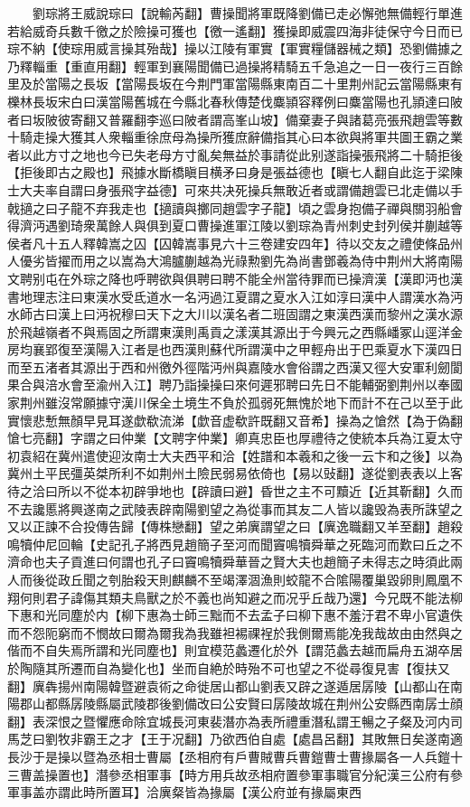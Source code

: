 　　劉琮將王威說琮曰【說輸芮翻】曹操聞將軍既降劉備已走必懈弛無備輕行單進若給威奇兵數千徼之於險操可獲也【徼一遙翻】獲操即威震四海非徒保守今日而已琮不納【使琮用威言操其殆哉】操以江陵有軍實【軍實糧儲器械之類】恐劉備據之乃釋輜重【重直用翻】輕軍到襄陽聞備已過操將精騎五千急追之一日一夜行三百餘里及於當陽之長坂【當陽長坂在今荆門軍當陽縣東南百二十里荆州記云當陽縣東有櫟林長坂宋白曰漢當陽舊城在今縣北春秋傳楚伐麋頴容釋例曰麋當陽也孔頴達曰陂者曰坂陂彼寄翻又普羅翻李巡曰陂者謂高峯山坡】備棄妻子與諸葛亮張飛趙雲等數十騎走操大獲其人衆輜重徐庶母為操所獲庶辭備指其心曰本欲與將軍共圖王霸之業者以此方寸之地也今已失老母方寸亂矣無益於事請從此别遂詣操張飛將二十騎拒後【拒後即古之殿也】飛據水斷橋瞋目横矛曰身是張益德也【瞋七人翻自此迄于梁陳士大夫率自謂曰身張飛字益德】可來共决死操兵無敢近者或謂備趙雲已北走備以手戟擿之曰子龍不弃我走也【擿讀與擲同趙雲字子龍】頃之雲身抱備子禪與關羽船會得濟沔遇劉琦衆萬餘人與俱到夏口曹操進軍江陵以劉琮為青州刺史封列侯并蒯越等侯者凡十五人釋韓嵩之囚【囚韓嵩事見六十三卷建安四年】待以交友之禮使條品州人優劣皆擢而用之以嵩為大鴻臚蒯越為光祿勲劉先為尚書鄧羲為侍中荆州大將南陽文聘别屯在外琮之降也呼聘欲與俱聘曰聘不能全州當待罪而已操濟漢【漢即沔也漢書地理志注曰東漢水受氐道水一名沔過江夏謂之夏水入江如淳曰漢中人謂漢水為沔水師古曰漢上曰沔祝穆曰天下之大川以漢名者二班固謂之東漢西漢而黎州之漢水源於飛越嶺者不與焉固之所謂東漢則禹貢之漾漢其源出于今興元之西縣嶓冢山逕洋金房均襄郢復至漢陽入江者是也西漢則蘇代所謂漢中之甲輕舟出于巴乘夏水下漢四日而至五渚者其源出于西和州徼外徑階沔州與嘉陵水會俗謂之西漢又徑大安軍利劒閬果合與涪水會至渝州入江】聘乃詣操操曰來何遲邪聘曰先日不能輔弼劉荆州以奉國家荆州雖沒常願據守漢川保全土境生不負於孤弱死無愧於地下而計不在己以至于此實懷悲慙無顏早見耳遂歔欷流涕【歔音虚欷許既翻又音希】操為之愴然【為于偽翻愴七亮翻】字謂之曰仲業【文聘字仲業】卿真忠臣也厚禮待之使統本兵為江夏太守初袁紹在冀州遣使迎汝南士大夫西平和洽【姓譜和本羲和之後一云卞和之後】以為冀州土平民彊英桀所利不如荆州土險民弱易依倚也【易以䜴翻】遂從劉表表以上客待之洽曰所以不從本初辟爭地也【辟讀曰避】昏世之主不可黷近【近其靳翻】久而不去讒慝將興遂南之武陵表辟南陽劉望之為從事而其友二人皆以讒毁為表所誅望之又以正諫不合投傳告歸【傳株戀翻】望之弟廙謂望之曰【廙逸職翻又羊至翻】趙殺鳴犢仲尼回輪【史記孔子將西見趙簡子至河而聞竇鳴犢舜華之死臨河而歎曰丘之不濟命也夫子貢進曰何謂也孔子曰竇鳴犢舜華晉之賢大夫也趙簡子未得志之時須此兩人而後從政丘聞之刳胎殺天則麒麟不至竭澤涸漁則蛟龍不合隂陽覆巢毀卵則鳳凰不翔何則君子諱傷其類夫鳥獸之於不義也尚知避之而况乎丘哉乃還】今兄既不能法柳下惠和光同塵於内【柳下惠為士師三黜而不去孟子曰柳下惠不羞汙君不卑小官遺佚而不怨阨窮而不憫故曰爾為爾我為我雖袒裼祼裎於我側爾焉能凂我哉故由由然與之偕而不自失焉所謂和光同塵也】則宜模范蠡遷化於外【謂范蠡去越而扁舟五湖卒居於陶隨其所遷而自為變化也】坐而自絶於時殆不可也望之不從尋復見害【復扶又翻】廙犇揚州南陽韓暨避袁術之命徙居山都山劉表又辟之遂遁居孱陵【山都山在南陽郡山都縣孱陵縣屬武陵郡後劉備改曰公安賢曰孱陵故城在荆州公安縣西南孱士顔翻】表深恨之暨懼應命除宜城長河東裴潛亦為表所禮重潛私謂王暢之子粲及河内司馬芝曰劉牧非霸王之才【王于况翻】乃欲西伯自處【處昌呂翻】其敗無日矣遂南適長沙于是操以暨為丞相士曹屬【丞相府有戶曹賊曹兵曹鎧曹士曹掾屬各一人兵鎧十三曹盖操置也】潛參丞相軍事【時方用兵故丞相府置參軍事職官分紀漢三公府有參軍事盖亦謂此時所置耳】洽廙粲皆為掾屬【漢公府並有掾屬東西